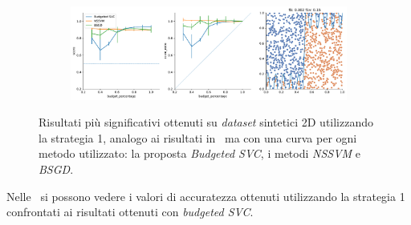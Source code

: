 \begin{figure}
\begin{subfigure}{.5\textwidth}
    \end{subfigure}
    \hfill
    \begin{subfigure}{.5\textwidth}
        \centering
        \includegraphics[width=\textwidth]{img/comp_old/15.pdf}
    \end{subfigure}
\caption[Risultati su \emph{dataset} sintetici utilizzando strategia 1 in confronto ad altri metodi.]{Risultati più significativi ottenuti su \emph{dataset} sintetici 2D utilizzando la strategia 1, analogo ai risultati in~ ma con una curva per ogni metodo utilizzato: la proposta \emph{Budgeted SVC}, i metodi \emph{NSSVM} e \emph{BSGD}.}
\label{fig:comp_old}
\end{figure}   
Nelle~ si possono vedere i valori di accuratezza ottenuti utilizzando la strategia 1 confrontati ai risultati ottenuti con \emph{budgeted SVC}.

